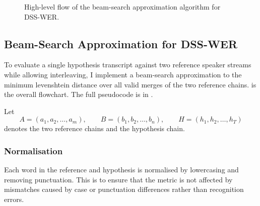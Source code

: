 \begin{figure}[ht]
{
}
\caption{High-level flow of the beam-search approximation algorithm for DSS-WER.}
\label{fig:dss_wer_flow}
\end{figure}
\subsection{Beam-Search Approximation for DSS-WER}
\label{sec:dss_wer_algorithm}
To evaluate a single hypothesis transcript against two reference speaker streams while allowing interleaving, I implement a beam-search approximation to the minimum levenshtein distance over all valid merges of the two reference chains.  is the overall flowchart. The full pseudocode is in .

Let
\begin{equation}
A=(a_1,a_2,\dots, a_m), \qquad B=(b_1,b_2, \dots, b_n), \qquad H=(h_1,h_2,\dots, h_T)
\end{equation}
denotes the two reference chains and the hypothesis chain.

\subsubsection{Normalisation}
Each word in the reference and hypothesis is normalised by lowercasing and removing punctuation. This is to ensure that the metric is not affected by mismatches caused by case or punctuation differences rather than recognition errors.
